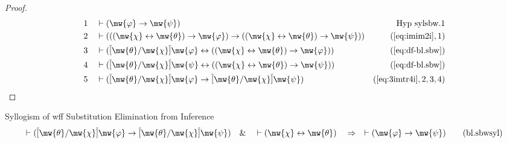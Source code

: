 \begin{proof}
\begin{align}
  1 &&  & \vdash ( \mw{\varphi} \rightarrow \mw{\psi}
     )&\text{Hyp~sylsbw.1}\notag%
  \\ 2 &&  & \vdash ( ( ( \mw{\chi} \leftrightarrow \mw{\theta} ) \rightarrow
     \mw{\varphi} ) \rightarrow ( ( \mw{\chi}
     \leftrightarrow \mw{\theta} ) \rightarrow \mw{\psi} )
     )&(\mbox{\ref{eq:imim2i}},1)\notag
  \\ 3 &&  & \vdash ( \overline{[} \mw{\theta} / \mw{\chi} \overline{]}
     \mw{\varphi} \leftrightarrow ( ( \mw{\chi}
     \leftrightarrow \mw{\theta} ) \rightarrow
     \mw{\varphi} ) )&(\mbox{\ref{eq:df-bl.sbw}})\notag
  \\ 4 &&  & \vdash ( \overline{[} \mw{\theta} / \mw{\chi} \overline{]}
     \mw{\psi} \leftrightarrow ( ( \mw{\chi}
     \leftrightarrow \mw{\theta} ) \rightarrow \mw{\psi} )
     )&(\mbox{\ref{eq:df-bl.sbw}})\notag
  \\ 5 &&  & \vdash ( \overline{[} \mw{\theta} / \mw{\chi} \overline{]}
     \mw{\varphi} \rightarrow \overline{[} \mw{\theta} /
     \mw{\chi} \overline{]} \mw{\psi}
     )&(\mbox{\ref{eq:3imtr4i}},2,3,4)\notag
\end{align}
\end{proof}

\begin{lemma} {Syllogism of wff Substitution Elimination
from Inference}
\begin{align}
\vdash ( \overline{[} \mw{\theta} / \mw{\chi} \overline{]} \mw{\varphi}
    \rightarrow \overline{[} \mw{\theta} / \mw{\chi} \overline{]} \mw{\psi}
    )\quad\&\quad \vdash ( \mw{\chi} \leftrightarrow \mw{\theta}
    )\quad\Rightarrow\quad \vdash ( \mw{\varphi} \rightarrow \mw{\psi}
    )\label{eq:bl.sbwsyl}\tag{bl.sbwsyl}
\end{align}
\end{lemma}


